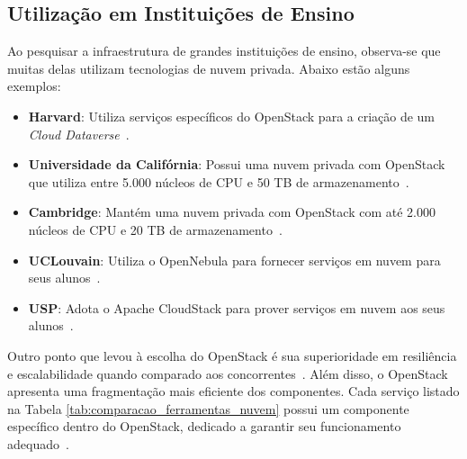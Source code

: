\subsection{Utilização em Instituições de Ensino}

Ao pesquisar a infraestrutura de grandes instituições de ensino, observa-se que muitas delas utilizam tecnologias de nuvem privada. Abaixo estão alguns exemplos:

\begin{itemize}
    \item \textbf{Harvard}: Utiliza serviços específicos do OpenStack para a criação de um \textit{Cloud Dataverse}~\citep{CloudDataverseSwiftHarvard}.
    \item \textbf{Universidade da Califórnia}: Possui uma nuvem privada com OpenStack que utiliza entre 5.000 núcleos de CPU e 50 TB de armazenamento~\citep{UniversitiesUsingOpenStackOpenMetal}.
    \item \textbf{Cambridge}: Mantém uma nuvem privada com OpenStack com até 2.000 núcleos de CPU e 20 TB de armazenamento~\citep{UniversitiesUsingOpenStackOpenMetal}.
    \item \textbf{UCLouvain}: Utiliza o OpenNebula para fornecer serviços em nuvem para seus alunos~\citep{UCLouvainOpenNebula}.
    \item \textbf{USP}: Adota o Apache CloudStack para prover serviços em nuvem aos seus alunos~\citep{USPCloudStack}.
\end{itemize}

Outro ponto que levou à escolha do OpenStack é sua superioridade em resiliência e escalabilidade quando comparado aos concorrentes~\citep{vogel2016private}. Além disso, o OpenStack apresenta uma fragmentação mais eficiente dos componentes. Cada serviço listado na Tabela \ref{tab:comparacao_ferramentas_nuvem} possui um componente específico dentro do OpenStack, dedicado a garantir seu funcionamento adequado~\citep{vogel2016private}.
